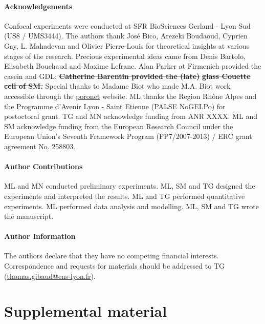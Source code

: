 \documentclass[twocolumn,superscriptaddress,showpacs,preprintnumbers,
amsmath,amssymb,prl]{revtex4-1}
\newcommand{\sseb}[1]{\sout{\textbf{\color{blue}#1}}} %
\begin{document}
\paragraph*{Acknowledgements}
Confocal experiments were conducted at SFR BioSciences Gerland - Lyon Sud (US8 / UMS3444).
The authors thank José Bico, Arezeki Boudaoud, Cyprien Gay, L. Mahadevan and Olivier Pierre-Louis for theoretical insights at various stages of the research. 
Precious experimental ideas came from Denis Bartolo, Elisabeth Bouchaud and Maxime Lefranc.
Alan Parker at Firmenich provided the casein and GDL; \sseb{Catherine Barentin provided the (late)}
\sseb{glass Couette cell of SM.}
Special thanks to Madame Biot who made M.A. Biot work accessible through the \href{http://www.olemiss.edu/sciencenet/poronet/}{poronet} website. 
ML thanks the Region Rhône Alpes and the Programme d'Avenir Lyon - Saint Etienne (PALSE NoGELPo) for postoctoral grant. 
TG and MN acknowledge funding from ANR XXXX. 
ML and SM acknowledge funding from the European Research Council under the European Union's Seventh Framework Program (FP7/2007-2013) / ERC grant agreement No. 258803.


\paragraph*{Author Contributions}
ML and MN conducted preliminary experiments. ML, SM and TG designed the experiments and interpreted the results. ML and TG performed quantitative experiments. ML performed data analysis and modelling. ML, SM and TG wrote the manuscript.


\paragraph*{Author Information} 
The authors declare that they have no competing financial interests. 
Correspondence and requests for materials should be addressed to TG (\href{mailto:thomas.gibaud@ens-lyon.fr}{thomas.gibaud@ens-lyon.fr}).


\clearpage
\newpage
\setcounter{figure}{0}

\section*{Supplemental material}
\end{document}
